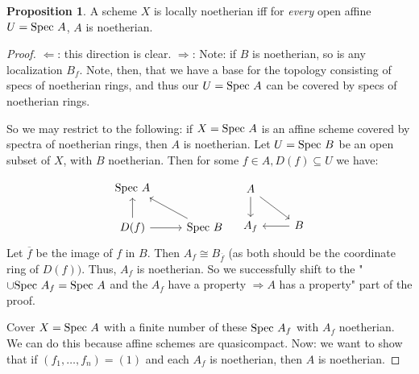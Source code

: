 \documentclass[10pt,reqno]{amsart}
\theoremstyle{definition}
\newtheorem{proposition}[theorem]{Proposition}
\theoremstyle{remark}
\numberwithin{equation}{section}
\numberwithin{theorem}{section}
\newcommand{\spec}{\textup{Spec }}
\begin{document}
\begin{proposition} A scheme $X$ is locally noetherian iff for \textit{every} open affine $U = \spec A$, $A$ is noetherian.
\end{proposition}
\begin{proof} \text{ }
$\Leftarrow$: this direction is clear.
$\Rightarrow$: Note: if $B$ is noetherian, so is any localization $B_f$. Note, then, that we have a base for the topology consisting of specs of noetherian rings, and thus our $U = \spec A$ can be covered by specs of noetherian rings.

So we may restrict to the following: if $X = \spec A$ is an affine scheme covered by spectra of noetherian rings, then $A$ is noetherian. Let $U = \spec B$ be an open subset of $X$, with $B$ noetherian. Then for some $f \in A, D(f) \subseteq U$ we have:

\[\begin{tikzcd}
\spec A & \\
D(f) \arrow[u] \arrow[r] & \spec B \arrow[ul]
\end{tikzcd} \quad
\begin{tikzcd}
A \arrow[d] \arrow[dr]& \\
A_f & \arrow[l] B
\end{tikzcd}\]
Let $\overline{f}$ be the image of $f$ in $B$. Then $A_f \cong B_{\overline{f}}$ (as both should be the coordinate ring of $D(f))$. Thus, $A_f$ is noetherian. So we successfully shift to the "$\cup \spec A_f = \spec A$ and the $A_f$ have a property $\Rightarrow A$ has a property" part of the proof.

Cover $X = \spec A$ with a finite number of these $\spec A_f$ with $A_f$ noetherian. We can do this because affine schemes are quasicompact. Now: we want to show that if $(f_1,\dots,f_n) = (1)$ and each $A_f$ is noetherian, then $A$ is noetherian. 


\end{proof}
\end{document}
